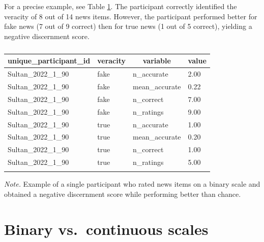 \documentclass[
  man]{apa6}
\begin{document}
For a precise example, see Table \ref{tab:single-participant-example}. The participant correctly identified the veracity of 8 out of 14 news items. However, the participant performed better for fake news (7 out of 9 correct) then for true news (1 out of 5 correct), yielding a negative discernment score.

\begin{table}[tbp]

\begin{center}
\begin{threeparttable}

\caption{\label{tab:single-participant-example}}

\begin{tabular}{llll}
\toprule
unique\_participant\_id & \multicolumn{1}{c}{veracity} & \multicolumn{1}{c}{variable} & \multicolumn{1}{c}{value}\\
\midrule
Sultan\_2022\_1\_90 & fake & n\_accurate & 2.00\\
Sultan\_2022\_1\_90 & fake & mean\_accurate & 0.22\\
Sultan\_2022\_1\_90 & fake & n\_correct & 7.00\\
Sultan\_2022\_1\_90 & fake & n\_ratings & 9.00\\
Sultan\_2022\_1\_90 & true & n\_accurate & 1.00\\
Sultan\_2022\_1\_90 & true & mean\_accurate & 0.20\\
Sultan\_2022\_1\_90 & true & n\_correct & 1.00\\
Sultan\_2022\_1\_90 & true & n\_ratings & 5.00\\
\bottomrule
\addlinespace
\end{tabular}

\begin{tablenotes}[para]
\normalsize{\textit{Note.} Example of a single participant who rated news items on a binary scale and obtained a negative discernment score while performing better than chance.}
\end{tablenotes}

\end{threeparttable}
\end{center}

\end{table}

\clearpage

\section{Binary vs.~continuous scales}\label{binary}
\end{document}
